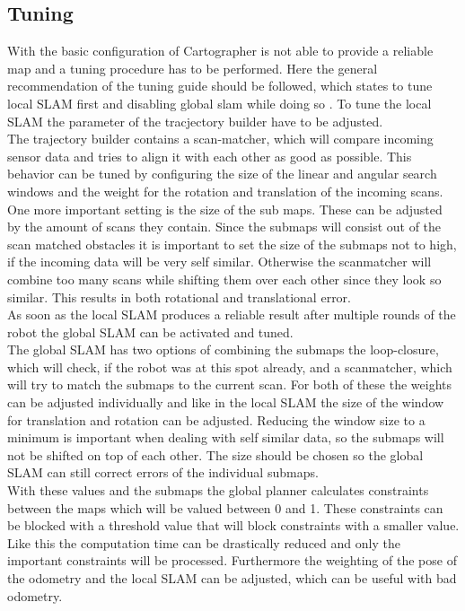 \subsection{Tuning}
With the basic configuration of Cartographer is not able to provide a reliable map and a tuning procedure has to be performed. Here the general recommendation of the tuning guide should be followed, which states to tune local SLAM first and disabling global slam while doing so \cite{cartographertuning}.
To tune the local SLAM the parameter of the tracjectory builder have to be adjusted.\\
The trajectory builder contains a scan-matcher, which will compare incoming sensor data and tries to align it with each other as good as possible. This behavior can be tuned by configuring the size of the linear and angular search windows and the weight for the rotation and translation of the incoming scans.\\
One more important setting is the size of the sub maps. These can be adjusted by the amount of scans they contain. Since the submaps will consist out of the scan matched obstacles it is important to set the size of the submaps not to high, if the incoming data will be very self similar. Otherwise the scanmatcher will combine too many scans while shifting them over each other since they look so similar. This results in both rotational and translational error.\\
As soon as the local SLAM produces a reliable result after multiple rounds of the robot the global SLAM can be activated and tuned.\\

The global SLAM has two options of combining the submaps the loop-closure, which will check, if the robot was at this spot already, and a scanmatcher, which will try to match the submaps to the current scan. For both of these the weights can be adjusted individually and like in the local SLAM the size of the window for translation and rotation can be adjusted. Reducing the window size to a minimum is important when dealing with self similar data, so the submaps will not be shifted on top of each other. The size should be chosen so the global SLAM can still correct errors of the individual submaps.\\
With these values and the submaps the global planner calculates constraints between the maps which will be valued between 0 and 1. These constraints can be blocked with a threshold value that will block constraints with a smaller value. Like this the computation time can be drastically reduced and only the important constraints will be processed. Furthermore the weighting of the pose of the odometry and the local SLAM can be adjusted, which can be useful with bad odometry.

